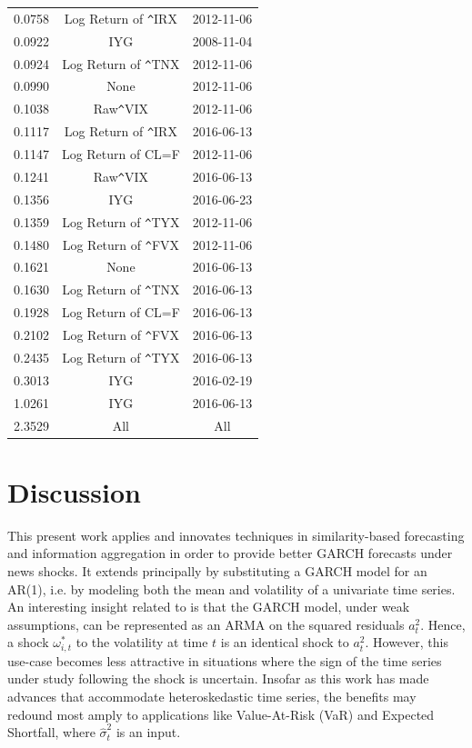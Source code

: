 \documentclass{uiucthesis2021}
\theoremstyle{definition}
\begin{document}
\begin{table}[h]
\begin{tabular}{ccc}
      0.0758 & Log Return of \verb|^|IRX & 2012-11-06 \\ 
      0.0922 & IYG & 2008-11-04 \\ 
      0.0924 & Log Return of \verb|^|TNX & 2012-11-06 \\ 
      0.0990 & None & 2012-11-06 \\ 
      0.1038 & Raw\verb|^|VIX & 2012-11-06 \\ 
      0.1117 & Log Return of \verb|^|IRX & 2016-06-13 \\ 
      0.1147 & Log Return of CL=F & 2012-11-06 \\ 
      0.1241 & Raw\verb|^|VIX & 2016-06-13 \\ 
      0.1356 & IYG & 2016-06-23 \\ 
      0.1359 & Log Return of \verb|^|TYX & 2012-11-06 \\ 
      0.1480 & Log Return of \verb|^|FVX & 2012-11-06 \\ 
      0.1621 & None & 2016-06-13 \\ 
      0.1630 & Log Return of \verb|^|TNX & 2016-06-13 \\ 
      0.1928 & Log Return of CL=F & 2016-06-13 \\ 
      0.2102 & Log Return of \verb|^|FVX & 2016-06-13 \\ 
      0.2435 & Log Return of \verb|^|TYX & 2016-06-13 \\ 
      0.3013 & IYG & 2016-02-19 \\ 
      1.0261 & IYG & 2016-06-13 \\
      \rowcolor{red} 2.3529 & All & All \\ 
       \hline
    \end{tabular}
    \endgroup
    \end{table}\label{multiverse_table}

\section{Discussion}

This present work applies and innovates techniques in similarity-based forecasting and information aggregation in order to provide better GARCH forecasts under news shocks.  It extends \cite[][]{lin2021minimizing} principally by substituting a GARCH model for an AR(1), i.e. by modeling both the mean and volatility of a univariate time series.  An interesting insight related to \cite[][]{lin2021minimizing} is that the GARCH model, under weak assumptions, can be represented as an ARMA on the squared residuals $a^{2}_{t}$.  Hence, a shock $\omega^{*}_{i,t}$ to the volatility at time $t$ is an identical shock to $a^{2}_{t}$. However, this use-case becomes less attractive in situations where the sign of the time series under study following the shock is uncertain.  Insofar as this work has made advances that accommodate heteroskedastic time series, the benefits may redound most amply to applications like Value-At-Risk (VaR) and Expected Shortfall, where $\hat\sigma^{2}_{t}$ is an input.
\end{document}
